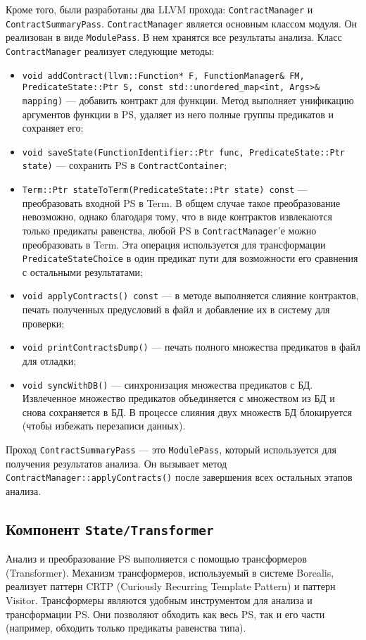Кроме того, были разработаны два LLVM прохода: \texttt{ContractManager} и \texttt{ContractSummaryPass}. \texttt{ContractManager} является основным классом модуля. Он реализован в виде \texttt{ModulePass}. В нем хранятся все результаты анализа. Класс \texttt{ContractManager} реализует следующие методы:
\begin{itemize}
\item \texttt{void addContract(llvm::Function* F, FunctionManager\& FM, PredicateState::Ptr S, const std::unordered_map<int, Args>\& mapping)} --- добавить контракт для функции. Метод выполняет унификацию аргументов функции в PS, удаляет из него полные группы предикатов и сохраняет его;
\item \texttt{void saveState(FunctionIdentifier::Ptr func, PredicateState::Ptr state)} --- сохранить PS в \texttt{ContractContainer};
\item \texttt{Term::Ptr stateToTerm(PredicateState::Ptr state) const} --- преобразовать входной PS в Term. В общем случае такое преобразование невозможно, однако благодаря тому, что в виде контрактов извлекаются только предикаты равенства, любой PS в \texttt{ContractManager}'е можно преобразовать в Term. Эта операция используется для трансформации \texttt{PredicateStateChoice} в один предикат пути для возможности его сравнения с остальными результатами;
\item \texttt{void applyContracts() const} --- в методе выполняется слияние контрактов, печать полученных предусловий в файл и добавление их в систему для проверки;
\item \texttt{void printContractsDump()} --- печать полного множества предикатов в файл для отладки;
\item \texttt{void syncWithDB()} --- синхронизация множества предикатов с БД. Извлеченное множество предикатов объединяется с множеством из БД и снова сохраняется в БД. В процессе слияния двух множеств БД блокируется (чтобы избежать перезаписи данных).
\end{itemize}

Проход \texttt{ContractSummaryPass} --- это \texttt{ModulePass}, который используется для получения результатов анализа. Он вызывает метод \texttt{ContractManager::applyContracts()} после завершения всех остальных этапов анализа.

\subsection{Компонент \texttt{State/Transformer}}
Анализ и преобразование PS выполняется с помощью трансформеров (Transformer). Механизм трансформеров, используемый в системе Borealis, реализует паттерн CRTP (Curiously Recurring Template Pattern)\cite{crtp} и паттерн Visitor\cite{patterns}. Трансформеры являются удобным инструментом для анализа и трансформации PS. Они позволяют обходить как весь PS, так и его части (например, обходить только предикаты равенства типа).

